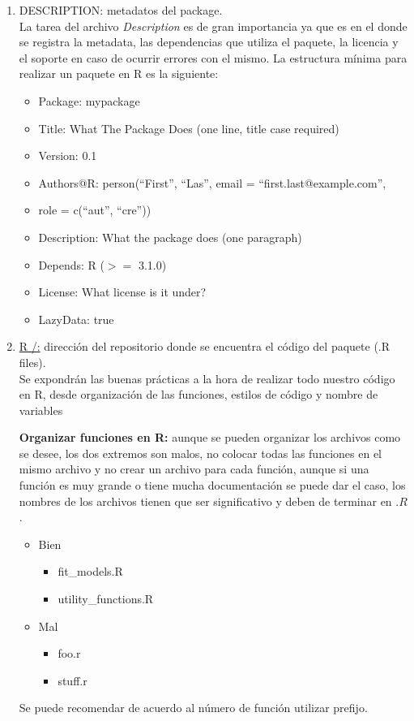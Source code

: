 \begin{enumerate}
  \item  DESCRIPTION: metadatos del package.\\
La tarea del archivo \textit{Description} es de gran importancia ya que es en el donde se registra la metadata, las dependencias que utiliza el paquete, la licencia y el soporte en caso de ocurrir errores con el mismo.
La estructura mínima para realizar un paquete en R es la siguiente:

\begin{itemize}
\item Package: mypackage
\item Title: What The Package Does (one line, title case required)
\item Version: 0.1
\item Authors@R: person(``First'', ``Las'', email = ``first.last@example.com'',
\item role = c(``aut'', ``cre''))
\item Description: What the package does (one paragraph)
\item Depends: R ($>=$ 3.1.0)
\item License: What license is it under?
\item LazyData: true
\end{itemize}
  \item \url{R /:} dirección del repositorio donde se encuentra el código del paquete (.R files).\\
Se expondrán las buenas prácticas a la hora de realizar todo nuestro código en R, desde organización de las funciones, estilos de código y nombre de variables 

\textbf{Organizar funciones en R:} aunque se pueden organizar los archivos como se desee, los dos extremos son malos, no colocar todas las funciones en el mismo archivo y no crear un archivo para cada función, aunque si una función es muy grande o tiene mucha documentación se puede dar el caso, los nombres de los archivos tienen que ser significativo y deben de terminar en $.R$.
\begin{itemize}
\item Bien  
\begin{itemize}
     \item fit\_models.R
     \item utility\_functions.R
  \end{itemize}
\item Mal
   \begin{itemize}
      \item foo.r
      \item stuff.r
    \end{itemize}
 \end{itemize}
Se puede recomendar de acuerdo al número de función utilizar prefijo.


\end{enumerate}
